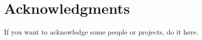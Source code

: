 \section*{Acknowledgments}
\ifhbreport \thispagestyle{plain} \else  \fi

If you want to acknowledge some people or projects, do it here.
